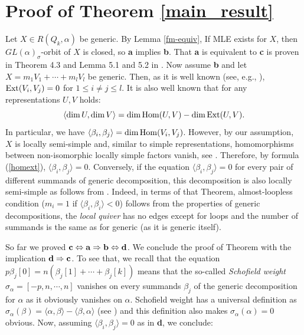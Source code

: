\documentclass[reqno]{amsart}
\theoremstyle{plain}
\theoremstyle{definition}
\theoremstyle{remark}
\begin{document}
\section{Proof of Theorem \ref{main_result}}

Let $X\in R(Q_k,\alpha)$ be generic. By Lemma \ref{fm-equiv}, If MLE exists for $X$, then $GL(\alpha)_{\sigma}$-orbit of $X$ is closed, so {\bf a} implies {\bf b}.  That {\bf a} is equivalent to {\bf c} is proven in Theorem 4.3 and Lemma 5.1 and 5.2 in \cite{fm}. Now assume {\bf b} and let $X=m_1V_1+\cdots+ m_lV_l$ be generic. Then, as it is well known (see, e.g., \cite{kac}), ${\rm Ext}(V_i,V_j)=0$ for $1\leq i\neq j \leq l$. It is also well known that for any representations $U,V$ holds:
\begin{equation}\label{homext}
\langle \dim U, \dim V\rangle = \dim {\rm Hom}(U,V) - \dim {\rm Ext}(U,V).
\end{equation}
In particular, we have $\langle \beta_i,\beta_j\rangle=\dim{\rm Hom}(V_i,V_j)$. However, by our assumption, $X$ is locally semi-simple and, similar to  simple representations, homomorphisms between non-isomorphic locally simple factors vanish, see \cite[Proposition~8]{sh07}. Therefore, by formula (\ref{homext}), $\langle \beta_i,\beta_j\rangle=0$. Conversely, if the equation $\langle \beta_i,\beta_j\rangle=0$ for every pair of different summands of generic decomposition, this decomposition is also locally semi-simple as follows from \cite[Theorem~4.3]{sh09}. Indeed, in terms of that Theorem, almost-loopless condition ($m_i=1$ if $\langle\beta_i,\beta_i\rangle <0$) follows from the properties of generic decompositions, the {\it local quiver} has no edges except for loops and the number of summands is the same as for generic (as it is generic itself).

So far we proved
${\bf c}\Leftrightarrow {\bf a}\Rightarrow{\bf b}\Leftrightarrow{\bf d}$. We conclude the proof of Theorem with the implication ${\bf d}\Rightarrow{\bf c}$. To see that, we recall that the equation $p\beta_j[0]=n(\beta_j[1]+\cdots+\beta_j[k])$ means that the so-called {\it Schofield weight} $\sigma_{\alpha}=[-p,n,\cdots,n]$ vanishes on every summands $\beta_j$ of the generic decomposition for $\alpha$ as it obviously vanishes on $\alpha$. Schofield weight has a universal definition as $\sigma_{\alpha}(\beta)=\langle \alpha, \beta\rangle - \langle \beta, \alpha\rangle$ (see \cite[Definition~3.9]{fm}) and this definition also makes $\sigma_{\alpha}(\alpha)=0$ obvious. Now, assuming $\langle \beta_i, \beta_j\rangle=0$ as in {\bf d}, we conclude:
\end{document}
